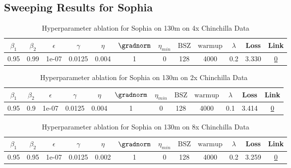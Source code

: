 \subsection{Sweeping Results for Sophia}%
\begin{table}[H]
\centering
\caption{Hyperparameter ablation for Sophia on 130m on 4x Chinchilla Data}
\label{tab:ablation_sophia_130m_4}
\begin{tabular}{cccccccccccc}
\toprule
$\beta_1$ & $\beta_2$ & $\epsilon$ & $\gamma$ & $\eta$ & $\gradnorm$ & $\eta_{min}$ & $\mathrm{BSZ}$ & $\mathrm{warmup}$ & $\lambda$ & Loss & Link \\
\midrule
0.95 & 0.99 & 1e-07 & 0.0125 & 0.004 & 1 & 0 & 128 & 4000 & 0.2 & 3.330 & \href{https://wandb.ai/stanford-mercury/optimizer-scaling/runs/sweep-130m-10B-sophia420680lr0.004-wd0.2-minlr0-warmup4000-b10.9-95e0d1}{0} \\
\midrule
\bottomrule
\end{tabular}
\end{table}

\begin{table}[H]
\centering
\caption{Hyperparameter ablation for Sophia on 130m on 2x Chinchilla Data}
\label{tab:ablation_sophia_130m_2}
\begin{tabular}{cccccccccccc}
\toprule
$\beta_1$ & $\beta_2$ & $\epsilon$ & $\gamma$ & $\eta$ & $\gradnorm$ & $\eta_{min}$ & $\mathrm{BSZ}$ & $\mathrm{warmup}$ & $\lambda$ & Loss & Link \\
\midrule
0.95 & 0.9 & 1e-07 & 0.0125 & 0.004 & 1 & 0 & 128 & 4000 & 0.1 & 3.414 & \href{https://wandb.ai/stanford-mercury/optimizer-scaling/runs/sweep-130m-5B-sophiaf95b3dlr0.004-wd0.1-minlr0-warmup4000-b10.95-187352}{0} \\
\midrule
\bottomrule
\end{tabular}
\end{table}

\begin{table}[H]
\centering
\caption{Hyperparameter ablation for Sophia on 130m on 8x Chinchilla Data}
\label{tab:ablation_sophia_130m_8}
\begin{tabular}{cccccccccccc}
\toprule
$\beta_1$ & $\beta_2$ & $\epsilon$ & $\gamma$ & $\eta$ & $\gradnorm$ & $\eta_{min}$ & $\mathrm{BSZ}$ & $\mathrm{warmup}$ & $\lambda$ & Loss & Link \\
\midrule
0.95 & 0.95 & 1e-07 & 0.0125 & 0.002 & 1 & 0 & 128 & 4000 & 0.2 & 3.259 & \href{https://wandb.ai/stanford-mercury/optimizer-scaling/runs/sweep-130m-21B-sophia8d270alr0.002-wd0.2-minlr0-warmup4000-b10.9-728991}{0} \\
\midrule
\bottomrule
\end{tabular}
\end{table}

